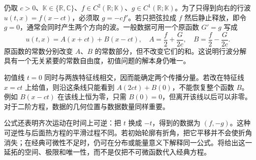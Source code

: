 仍取 \(c>0\)、\(\mathbb K\in\{\mathbb R,\mathbb C\}\)、\(f\in C^2(\mathbb R;\mathbb K)\)、\(g\in C^1(\mathbb R;\mathbb K)\)。为了只得到向右的行波 \(u(t,x)=f(x-ct)\)，必须取 \(g=-cf'\)。若只把弦拉成 \(f\) 然后静止释放，即令 \(g=0\)，通常会同时产生两个方向的波。一般数据可用一个原函数 \(G'=g\) 写成
\[
 u(t,x)=A(x+ct)+B(x-ct),\quad
 A=\dfrac f2+\dfrac G{2c},\quad
 B=\dfrac f2-\dfrac G{2c}.
\]
原函数的常数分别改变 \(A\)、\(B\) 的常数部分，但不改变它们的和。这说明行波分解具有一个无关紧要的常数自由度，初值问题的解本身仍唯一。

\ProseParagraphBreak

初值线 \(t=0\) 同时与两族特征线相交，因而能确定两个传播分量。若改在特征线 \(x=ct\) 上给值，则沿这条线只能看到 \(A(2ct)+B(0)\)，不能恢复整个函数 \(B\)。例如 \(B(x-ct)\) 在该线上恒为零，只需 \(B(0)=0\)，但离开该线以后可以非零。对于二阶方程，数据的几何位置与数据数量同样重要。

\ProseParagraphBreak

公式还表明齐次运动在时间上可逆：把 \(t\) 换成 \(-t\)，得到的数据为 \((f,-g)\)。这种可逆性与后面热方程的平滑过程不同。若初始轮廓有折角，把它平移并不会使折角消失；在经典可微性不足时，仍可在分布或能量意义下解释同一公式。将给出这一延拓的空间、极限和唯一性，而不是仅把不可微函数代入经典方程。
